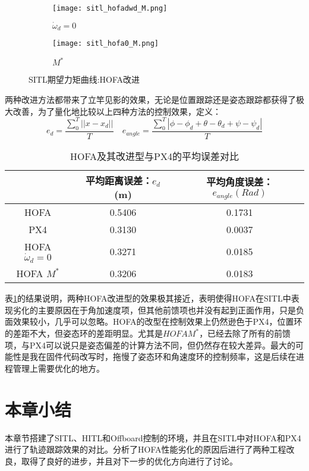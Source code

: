 \begin{figure}[H]
  \centering
\begin{subfigure}[b]{0.49\linewidth}
    \texttt{[image: sitl\_hofadwd\_M.png]}
    \caption{$\dot \omega_d =0$}
\end{subfigure}
\hfill
\begin{subfigure}[b]{0.49\linewidth}
    \texttt{[image: sitl\_hofa0\_M.png]}
    \caption{$M^*$}
\end{subfigure}
\caption{SITL期望力矩曲线:HOFA改进}
\end{figure}

两种改进方法都带来了立竿见影的效果，无论是位置跟踪还是姿态跟踪都获得了极大改善，为了量化地比较以上四种方法的控制效果，定义：
$$e_d=\frac{\sum_0^{T}||x-x_d||}{T} \quad e_{angle}=\frac{\sum_0^{T}|\phi-\phi_d+\theta-\theta_d+\psi-\psi_d|}{T}$$

\begin{table}[H]
  \centering
  \caption{HOFA及其改进型与PX4的平均误差对比}
  \label{HOFA改}
  \begin{tabular}{ccc}
      \toprule
      & 平均距离误差：$e_d$ (m)& 平均角度误差：$e_{angle}(Rad)$  \\
      \midrule
      HOFA &0.5406  & 0.1731\\
      PX4 & 0.3130 &  0.0037\\
      HOFA $\dot \omega_d=0$ & 0.3271 & 0.0185\\
      HOFA $M^*$ &0.3206  & 0.0183\\
      \bottomrule
  \end{tabular}
\end{table}
表\ref{HOFA改}的结果说明，两种HOFA改进型的效果极其接近，表明使得HOFA在SITL中表现劣化的主要原因在于角加速度项，但其他前馈项也并没有起到正面作用，只是负面效果较小，几乎可以忽略。HOFA的改型在控制效果上仍然逊色于PX4，位置环的差距不大，但姿态环的差距明显。尤其是$HOFA M^*$，已经去除了所有的前馈项，与PX4可以说只是姿态偏差的计算方法不同，但仍然存在较大差异。最大的可能性是我在固件代码改写时，拖慢了姿态环和角速度环的控制频率，这是后续在进程管理上需要优化的地方。
\newpage

\section{本章小结}
本章节搭建了SITL、HITL和Offboard控制的环境，并且在SITL中对HOFA和PX4进行了轨迹跟踪效果的对比。分析了HOFA性能劣化的原因后进行了两种工程改良，取得了良好的进步，并且对下一步的优化方向进行了讨论。